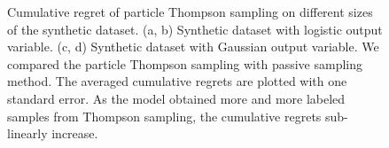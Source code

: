 \begin{figure}[t]
	\centering
	\caption{\label{fig:synthetic} Cumulative regret of particle Thompson sampling 
	on different sizes of the synthetic dataset. 
	(a, b) Synthetic dataset with logistic output variable.
	(c, d) Synthetic dataset with Gaussian output variable.
	We compared the particle Thompson sampling with passive sampling method. 
	The averaged cumulative regrets are plotted with one standard error. 
	As the model obtained more and more labeled samples from Thompson sampling, 
	the cumulative regrets sub-linearly increase.}
\end{figure}

